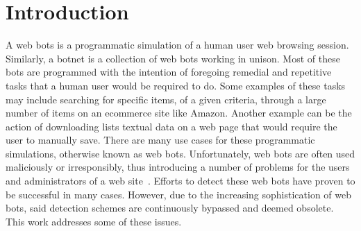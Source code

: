 ﻿
\chapter{Introduction}
A web bots is a programmatic simulation of a human user web browsing session. Similarly, a botnet is a collection of web bots working in unison. Most of these bots are programmed with the intention of foregoing remedial and repetitive tasks that a human user would be required to do. Some examples of these tasks may include searching for specific items, of a given criteria, through a large number of items on an ecommerce site like Amazon. Another example can be the action of downloading lists textual data on a web page that would require the user to manually save. There are many use cases for these programmatic simulations, otherwise known as web bots. Unfortunately, web bots are often used maliciously or irresponsibly, thus introducing a number of problems for the users and administrators of a web site~\cite{1ee426975c3d46d2ba6ef5c2d76384c5}. Efforts to detect these web bots have proven to be successful in many cases. However, due to the increasing sophistication of web bots, said detection schemes are continuously bypassed and deemed obsolete. This work addresses some of these issues.
